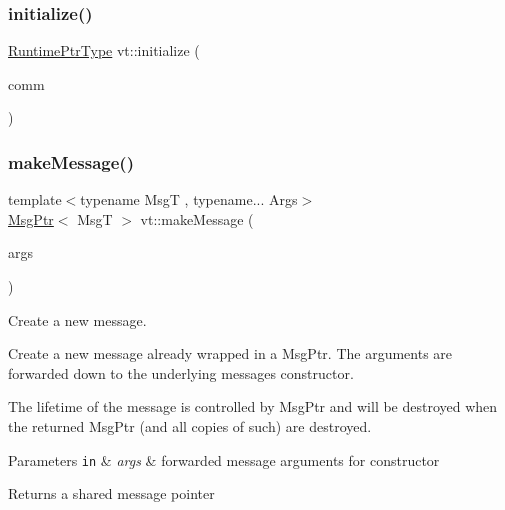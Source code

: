 \mbox{\label{namespacevt_a9e13ed8a04b3395bbff2f035cae656af}} 
\subsubsection{\texorpdfstring{initialize()}{initialize()}\hspace{0.1cm}{\footnotesize\ttfamily [3/3]}}
{\footnotesize\ttfamily \hyperlink{namespacevt_a0ce60e0299d8fa32223b3b9ffa0af466}{Runtime\+Ptr\+Type} vt\+::initialize (\begin{DoxyParamCaption}\item[{M\+P\+I\+\_\+\+Comm $\ast$}]{comm }\end{DoxyParamCaption})}

\mbox{\label{namespacevt_a948c0bbe39c34326b5453065a461ebaa}} 
\subsubsection{\texorpdfstring{make\+Message()}{makeMessage()}}
{\footnotesize\ttfamily template$<$typename MsgT , typename... Args$>$ \\
\hyperlink{namespacevt_a9f5ebd62ee9d6dd8829e3e1cc4f858e9}{Msg\+Ptr}$<$ MsgT $>$ vt\+::make\+Message (\begin{DoxyParamCaption}\item[{Args \&\&...}]{args }\end{DoxyParamCaption})}



Create a new message. 

Create a new message already wrapped in a Msg\+Ptr. The arguments are forwarded down to the underlying message\textquotesingle{}s constructor.

The lifetime of the message is controlled by Msg\+Ptr and will be destroyed when the returned Msg\+Ptr (and all copies of such) are destroyed.


\begin{DoxyParams}[1]{Parameters}
\mbox{\tt in}  & {\em args} & forwarded message arguments for constructor\\
\hline
\end{DoxyParams}
\begin{DoxyReturn}{Returns}
a shared message pointer 
\end{DoxyReturn}
\mbox{\label{namespacevt_a02d4a45f1b229ac6fd5da4bf289d6654}} 
